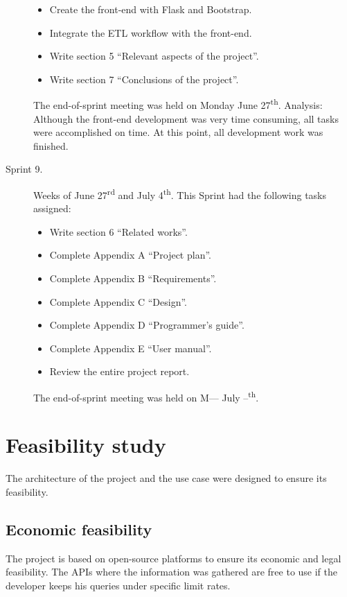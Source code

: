 \begin{description}
\begin{itemize}
		\item Create the front-end with Flask and Bootstrap.
		\item Integrate the ETL workflow with the front-end.
		\item Write section 5 ``Relevant aspects of the project''.
		\item Write section 7 ``Conclusions of the project''.
	\end{itemize}
	The end-of-sprint meeting was held on Monday June 27\textsuperscript{th}. Analysis: Although the front-end development was very time consuming, all tasks were accomplished on time. At this point, all development work was finished.
	\item[Sprint 9.] Weeks of June 27\textsuperscript{rd} and July 4\textsuperscript{th}. This Sprint had the following tasks assigned:
	\begin{itemize}
		\item Write section 6 ``Related works''.
		\item Complete Appendix A ``Project plan''.
		\item Complete Appendix B ``Requirements''.
		\item Complete Appendix C ``Design''.
		\item Complete Appendix D ``Programmer's guide''.
		\item Complete Appendix E ``User manual''.
		\item Review the entire project report.
	\end{itemize}
	The end-of-sprint meeting was held on M--- July --\textsuperscript{th}.
\end{description}

\section{Feasibility study}
\nonzeroparskip The architecture of the project and the use case were designed to ensure its feasibility.

\subsection{Economic feasibility}
\nonzeroparskip The project is based on open-source platforms to ensure its economic and legal feasibility. The APIs where the information was gathered are free to use if the developer keeps his queries under specific limit rates.

